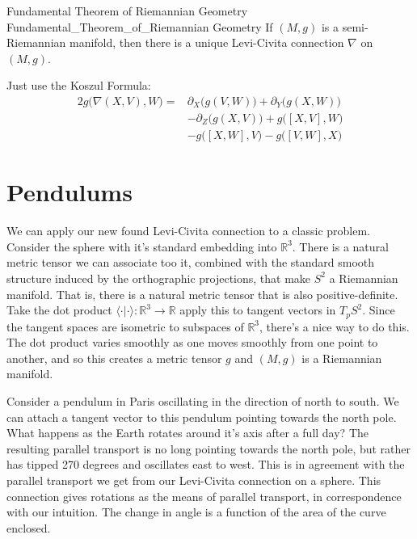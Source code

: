         \begin{ftheorem}{Fundamental Theorem of Riemannian Geometry}
                        {Fundamental_Theorem_of_Riemannian Geometry}
            If $(M,g)$ is a semi-Riemannian manifold, then there is a unique
            Levi-Civita connection $\nabla$ on $(M,g)$.
        \end{ftheorem}
        \begin{bproof}
            Just use the Koszul Formula:
            \begin{equation}
                \begin{split}
                    2g\big(\nabla(X,V),W)=&\partial_{X}\big(g(V,W)\big)+
                        \partial_{Y}\big(g(X,W)\big)\\
                        &-\partial_{Z}\big(g(X,V)\big)+g\big([X,V],W\big)\\
                        &-g\big([X,W],V\big)-g\big([V,W],X\big)
                \end{split}
            \end{equation}
        \end{bproof}
\section{Pendulums}
        We can apply our new found Levi-Civita connection to a classic problem.
        Consider the sphere with it's standard embedding into $\mathbb{R}^{3}$.
        There is a natural metric tensor we can associate too it, combined with
        the standard smooth structure induced by the orthographic projections,
        that make $S^{2}$ a Riemannian manifold. That is, there is a natural
        metric tensor that is also positive-definite. Take the dot product
        $\langle\cdot|\cdot\rangle:\mathbb{R}^{3}\rightarrow\mathbb{R}$ apply
        this to tangent vectors in $T_{p}S^{2}$. Since the tangent spaces are
        isometric to subspaces of $\mathbb{R}^{3}$, there's a nice way to do
        this. The dot product varies smoothly as one moves smoothly from one
        point to another, and so this creates a metric tensor $g$ and
        $(M,g)$ is a Riemannian manifold.
        \par\hfill\par
        Consider a pendulum in Paris oscillating in the direction of north to
        south. We can attach a tangent vector to this pendulum pointing towards
        the north pole. What happens as the Earth rotates around it's axis after
        a full day? The resulting parallel transport is no long pointing towards
        the north pole, but rather has tipped 270 degrees and oscillates east
        to west. This is in agreement with the parallel transport we get from
        our Levi-Civita connection on a sphere. This connection gives rotations
        as the means of parallel transport, in correspondence with our
        intuition. The change in angle is a function of the area of the curve
        enclosed.
